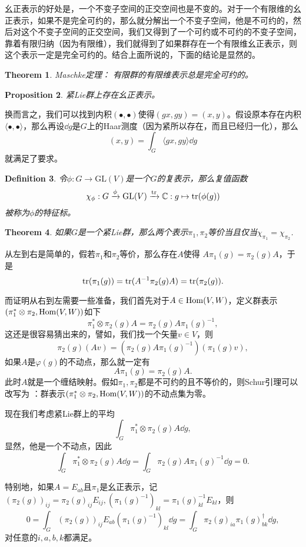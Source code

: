 \documentclass[9pt]{extbook}
\theoremstyle{plain}
\newtheorem{defi}{Definition}
\newtheorem{pro}[defi]{Proposition}
\newtheorem{theo}[defi]{Theorem}
\newcommand{\cc}{\mathbb{C}}
\begin{document}
幺正表示的好处是，一个不变子空间的正交空间也是不变的。对于一个有限维的幺正表示，如果不是完全可约的，那么就分解出一个不变子空间，他是不可约的，然后对这个不变子空间的正交空间，我们又得到了一个可约或不可约的不变子空间，靠着有限归纳（因为有限维），我们就得到了如果群存在一个有限维幺正表示，则这个表示一定是完全可约的。结合上面所说的，下面的结论是显然的。
\begin{theo}Maschke定理：
有限群的有限维表示总是完全可约的。 
\end{theo}

\begin{pro}
紧Lie群上存在幺正表示。
\end{pro}
换而言之，我们可以找到内积$(\bullet,\bullet)$使得$(gx,gy)=(x,y)$。假设原本存在内积$\langle \bullet,\bullet \rangle$，那么再设$\dd g$是$G$上的Haar测度（因为紧所以存在，而且已经归一化），那么
\[
	(x,y)=\int_G \langle gx,gy \rangle \dd g
\]
就满足了要求。

\begin{defi}
	令$\phi:G\to \mathrm{GL}(V)$是一个$G$的复表示，那么复值函数
	\[
	\chi_\phi:G\xrightarrow{\phi}\mathrm{GL}(V)\xrightarrow{\tr}\cc:g\mapsto \tr(\phi(g))
	\]
	被称为$\phi$的特征标。
\end{defi}
\begin{theo}
如果$G$是一个紧Lie群，那么两个表示$\pi_1,\pi_2$等价当且仅当$\chi_{\pi_1}=\chi_{\pi_2}$.
\end{theo}
从左到右是简单的，假若$\pi_1$和$\pi_2$等价，那么存在$A$使得
$A\pi_1(g)=\pi_2(g)A$，于是
\[
	\operatorname{tr}(\pi_1(g))=\operatorname{tr}(A^{-1}\pi_2(g)A)=\operatorname{tr}(\pi_2(g)).
\]

而证明从右到左需要一些准备，我们首先对于$A\in \operatorname{Hom}(V,W)$，定义群表示$(\pi_1^*\otimes\pi_2,\operatorname{Hom}(V,W))$如下
\[
	\pi_1^*\otimes\pi_2(g)A=\pi_2(g)A\pi_1(g)^{-1},
\]
这还是很容易猜出来的，譬如，我们找一个矢量$v\in V$，则
\[
	\pi_2(g)(Av)=(\pi_2(g)A\pi_1(g)^{-1})(\pi_1(g)v),
\]
如果$A$是$\varphi(g)$的不动点，那么就一定有
\[
	A\pi_1(g)=\pi_2(g)A.
\]
此时$A$就是一个缠结映射。假如$\pi_1,\pi_2$都是不可约的且不等价的，则Schur引理可以改写为  ：群表示$(\pi_1^*\otimes\pi_2,\operatorname{Hom}(V,W))$的不动点集为零。

现在我们考虑紧Lie群上的平均
\[
	\int_G \pi_1^*\otimes\pi_2(g)A \dd g,
\]
显然，他是一个不动点，因此
\[
	\int_G \pi_1^*\otimes\pi_2(g)A \dd g=\int_G \pi_2(g)A\pi_1(g)^{-1}\dd g=0.
\]

特别地，如果$A=E_{ab}$且$\pi_1$是幺正表示，记$(\pi_2(g))_{ij}=\pi_2(g)_{ij}E_{ij},\left(\pi_1(g)^{-1}\right)_{kl}=\pi_1(g)^{-1}_{kl}E_{kl}$，则
\[
0=\int_G (\pi_2(g))_{ij}E_{ab}\left(\pi_1(g)^{-1}\right)_{kl}\dd g=\int_G \pi_2(g)_{ia}\pi_1(g)^{\dag}_{bk}\dd g,
\]
对任意的$i,a,b,k$都满足。
\end{document}
